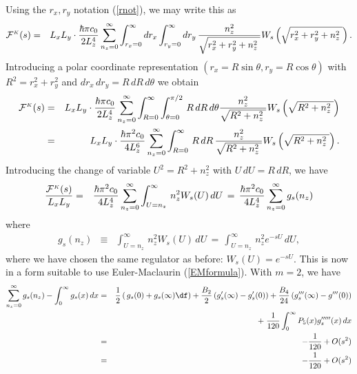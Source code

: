 \documentclass[sections]{tjwNOTES}
\newcommand\man[1]{\mathcal{#1}}
\newcommand\rx{r_{x}}
\newcommand\ry{r_{y}}
\newcommand\nz{n_{z}}
\newcommand\Lx{L_{x}}
\newcommand\Ly{L_{y}}
\newcommand\Lz{L_{z}}
\newcommand\K{\mbox{\tiny $K$}}
\begin{document}
Using the $\rx,\ry$ notation (\ref{rnot}), we may write this as
\begin{eqnarray*}
    \man{F}^{\K}(s) &=& \Lx\Ly \cdot \frac{\hbar\pi c_{0}}{2\Lz^{4}} \sum_{\nz=0}^{\infty} \int_{\rx=0}^{\infty}d\rx\int_{\ry=0}^{\infty}d\ry \,\frac{\nz^{2}}{\sqrt{ \rx^{2} + \ry^{2} + \nz^{2} \;}}W_{s}\left(\sqrt{  \rx^{2} + \ry^{2} + \nz^{2} \;}\right).
\end{eqnarray*}
Introducing a polar coordinate representation $(\rx=R\sin\theta, \ry=R\cos\theta)$ with $R^{2}=\rx^{2}+\ry^{2}$ and $d\rx\,d\ry = R\,dR\,d\theta$ we obtain
\begin{eqnarray*}
    \man{F}^{\K}(s) &=& \Lx\Ly \cdot \frac{\hbar\pi c_{0}}{2\Lz^{4}} \sum_{\nz=0}^{\infty} \int_{R=0}^{\infty}\int_{\theta=0}^{\pi/2} \,R\,dR\,d\theta\frac{\nz^{2}}{\sqrt{ R^{2} + \nz^{2} \;}}W_{s}\left(\sqrt{  R^{2} + \nz^{2} \;}\right) \\
    &=& \Lx\Ly \cdot \frac{\hbar\pi^{2}c_{0}}{4\Lz^{6}} \sum_{\nz=0}^{\infty} \int_{R=0}^{\infty} \,R\,dR\,\frac{\nz^{2}}{\sqrt{ R^{2} + \nz^{2} \;}}W_{s}\left(\sqrt{  R^{2} + \nz^{2} \;}\right).
\end{eqnarray*}
Introducing the change of variable $U^{2} = R^{2} + \nz^{2}$ with $U\,dU=R\,dR$, we have
\begin{eqnarray*}
    \frac{\man{F}^{\K}(s)}{\Lx\Ly} &=& \frac{\hbar\pi^{2}c_{0}}{4\Lz^{4}} \sum_{\nz=0}^{\infty} \int_{U=\nz}^{\infty}\,\nz^{2}W_{s}(U) \, dU \,=\,  \frac{\hbar\pi^{2}c_{0}}{4\Lz^{4}} \sum_{\nz=0}^{\infty} g_{s}(\nz)
\end{eqnarray*}
where
\begin{eqnarray*}
    g_{s}(\nz) &\equiv& \int_{U=\nz}^{\infty}\,\nz^{2}W_{s}(U) \, dU \,=\, \int_{U=\nz}^{\infty}\,\nz^{2}e^{-sU} \, dU ,
\end{eqnarray*}
where we have chosen the same regulator as before: $W_{s}(U)=e^{-sU}$. This is now in a form suitable to use Euler-Maclaurin (\ref{EMformula}). With $m=2$, we have
\begin{eqnarray*}
    \sum_{\nz=0}^{\infty} g_{s}(\nz) - \int_{0}^{\infty}g_{s}(x)\,dx &=& \frac{1}{2}\left(\,g_{s}(0) + g_{s}(\infty)\df\right) + \frac{B_{2}}{2}\left(g_{s}'(\infty) - g_{s}'(0)\right) + \frac{B_{4}}{24}\left(g_{s}'''(\infty) - g'''(0)\right) \\
    & & + \;\frac{1}{120}\int_{0}^{\infty} P_{5}(x)g_{s}'''''(x) \,dx \\
    &=& - \frac{1}{120} + O(s^{2}) \\
    &=& - \frac{1}{120} + O(s^{2})
\end{eqnarray*}
\end{document}
